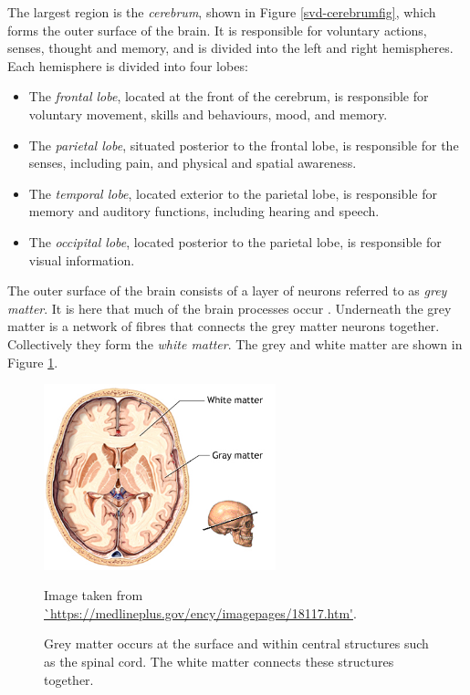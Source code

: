 The largest region is the \textit{cerebrum}, shown in Figure \ref{svd-cerebrumfig}, which forms the outer surface of the brain. It is responsible for voluntary actions, senses, thought and memory, and is divided into the left and right hemispheres. Each hemisphere is divided into four lobes:
 \begin{itemize}
	\item The \textit{frontal lobe}, located at the front of the cerebrum, is responsible for voluntary movement, skills and behaviours, mood, and memory.
	\item The \textit{parietal lobe}, situated posterior to the frontal lobe, is responsible for the senses, including pain, and physical and spatial awareness.
	\item The \textit{temporal lobe}, located exterior to the parietal lobe, is responsible for memory and auditory functions, including hearing and speech.
	\item The \textit{occipital lobe}, located posterior to the parietal lobe, is responsible for visual information.
\end{itemize}

The outer surface of the brain consists of a layer of neurons referred to as \textit{grey matter}. It is here that much of the brain processes occur \citep{Dafny1997}. Underneath the grey matter is a network of fibres that connects the grey matter neurons together. Collectively they form the \textit{white matter}. The grey and white matter are shown in Figure \ref{svd-greywhitefig}.

\begin{figure}[ht]
	\centering
	\includegraphics[width=0.6\textwidth]{Images/2_white_vs_grey.png}
	\caption{\small{Grey matter occurs at the surface and within central structures such as the spinal cord. The white matter connects these structures together.}}
	\small Image taken from \url{`https://medlineplus.gov/ency/imagepages/18117.htm'}.
	\label{svd-greywhitefig}
\end{figure}

